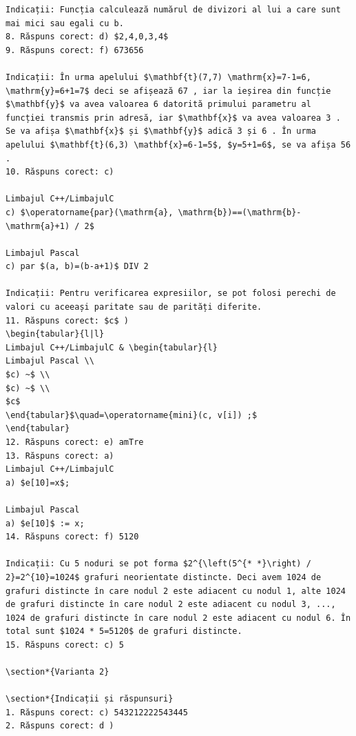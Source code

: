 \documentclass[10pt]{article}
\begin{document}
\begin{verbatim}
Indicații: Funcția calculează numărul de divizori al lui a care sunt mai mici sau egali cu b.
8. Răspuns corect: d) $2,4,0,3,4$
9. Răspuns corect: f) 673656

Indicații: În urma apelului $\mathbf{t}(7,7) \mathrm{x}=7-1=6, \mathrm{y}=6+1=7$ deci se afișează 67 , iar la ieșirea din funcție $\mathbf{y}$ va avea valoarea 6 datorită primului parametru al funcției transmis prin adresă, iar $\mathbf{x}$ va avea valoarea 3 . Se va afișa $\mathbf{x}$ și $\mathbf{y}$ adică 3 și 6 . În urma apelului $\mathbf{t}(6,3) \mathbf{x}=6-1=5$, $y=5+1=6$, se va afișa 56 .
10. Răspuns corect: c)

Limbajul C++/LimbajulC
c) $\operatorname{par}(\mathrm{a}, \mathrm{b})==(\mathrm{b}-\mathrm{a}+1) / 2$

Limbajul Pascal
c) par $(a, b)=(b-a+1)$ DIV 2

Indicații: Pentru verificarea expresiilor, se pot folosi perechi de valori cu aceeași paritate sau de parități diferite.
11. Răspuns corect: $c$ )
\begin{tabular}{l|l} 
Limbajul C++/LimbajulC & \begin{tabular}{l} 
Limbajul Pascal \\
$c) ~$ \\
$c) ~$ \\
$c$
\end{tabular}$\quad=\operatorname{mini}(c, v[i]) ;$
\end{tabular}
12. Răspuns corect: e) amTre
13. Răspuns corect: a)
Limbajul C++/LimbajulC
a) $e[10]=x$;

Limbajul Pascal
a) $e[10]$ := x;
14. Răspuns corect: f) 5120

Indicații: Cu 5 noduri se pot forma $2^{\left(5^{* *}\right) / 2}=2^{10}=1024$ grafuri neorientate distincte. Deci avem 1024 de grafuri distincte în care nodul 2 este adiacent cu nodul 1, alte 1024 de grafuri distincte în care nodul 2 este adiacent cu nodul 3, ..., 1024 de grafuri distincte în care nodul 2 este adiacent cu nodul 6. În total sunt $1024 * 5=5120$ de grafuri distincte.
15. Răspuns corect: c) 5

\section*{Varianta 2}

\section*{Indicații și răspunsuri}
1. Răspuns corect: c) 543212222543445
2. Răspuns corect: d )


\end{verbatim}
\end{document}
